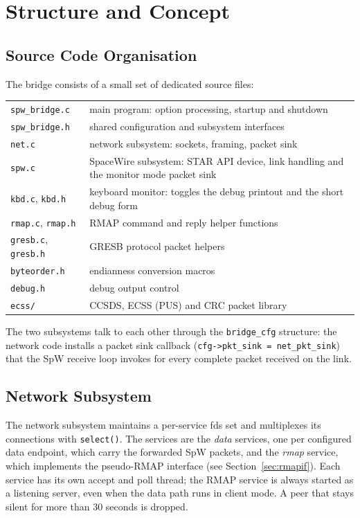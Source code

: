 \chapter{Structure and Concept}

\section{Source Code Organisation}

The bridge consists of a small set of dedicated source files:

\noindent
\begin{tabu} to 
	\texttt{spw\_bridge.c}	& main program: option processing, startup and shutdown \\
	\texttt{spw\_bridge.h}	& shared configuration and subsystem interfaces \\
	\texttt{net.c}		& network subsystem: sockets, framing, packet sink \\
	\texttt{spw.c}		& SpaceWire subsystem: STAR API device, link handling and the monitor mode packet sink \\
	\texttt{kbd.c}, \texttt{kbd.h}& keyboard monitor: toggles the debug printout and the short debug form \\
	\texttt{rmap.c}, \texttt{rmap.h}& RMAP command and reply helper functions \\
	\texttt{gresb.c}, \texttt{gresb.h}& GRESB protocol packet helpers \\
	\texttt{byteorder.h}	& endianness conversion macros \\
	\texttt{debug.h}		& debug output control \\
	\texttt{ecss/}		& \gls{CCSDS}, \gls{ECSS} (\gls{PUS}) and \gls{CRC} packet library \\
\end{tabu}

\noindent
The two subsystems talk to each other through the \texttt{bridge\_cfg}
structure: the network code installs a packet sink callback
(\texttt{cfg->pkt\_sink = net\_pkt\_sink}) that the \gls{SpW} receive loop
invokes for every complete packet received on the link.

\section{Network Subsystem}
\label{sec:net}

The network subsystem maintains a per-service fds set and multiplexes its
connections with \texttt{select()}. The services are the \emph{data}
services, one per configured data endpoint, which carry the forwarded
\gls{SpW} packets, and the \emph{rmap} service, which implements the
pseudo-\gls{RMAP} interface (see Section~\ref{sec:rmapif}).
Each service has its own accept and poll thread; the RMAP service is always
started as a listening server, even when the data path runs in client mode.
A peer that stays silent for more than 30 seconds is dropped.
\\

